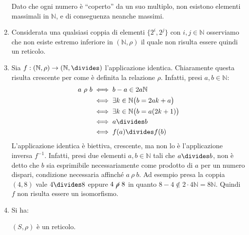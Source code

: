 \begin{enumerate}[label=(\textit{\roman*})]
Dato che ogni numero è ``coperto'' da un suo multiplo, non esistono elementi massimali in $\mathbb{N}$, e di conseguenza neanche massimi.
\item Considerata una qualsiasi coppia di elementi $\{2^{i},2^{j}\}$ con $i,j \in \mathbb{N}$ osserviamo che non esiste estremo inferiore in $(\mathbb{N},\rho)$ il quale non risulta essere quindi un reticolo.
\item Sia $f: (\mathbb{N},\rho) \rightarrow (\mathbb{N},\divides)$ l'applicazione identica. Chiaramente questa risulta crescente per come è definita la relazione $\rho$. Infatti, presi $a, b \in \mathbb{N}$:
\begin{align*}
	a \ \rho \ b &\iff b-a \in 2a\mathbb{N} \\
	&\iff \exists k \in \mathbb{N} \bigl( b= 2ak+a\bigr) \\
	&\iff \exists k \in \mathbb{N} \bigl(b=a(2k+1)\bigr) \\
	&\iff a \divides b\\
	&\iff f(a) \divides f(b)
\end{align*}
L'applicazione identica è biettiva, crescente, ma non lo è l'applicazione inversa $f^{-1}$. Infatti, presi due elementi $a,b \in \mathbb{N}$ tali che $a \divides b$, non è detto che $b$ sia esprimibile necessariamente come prodotto di $a$ per un numero dispari, condizione necessaria affinché $a \ \rho \ b$. Ad esempio presa la coppia $(4,8)$ vale $4 \divides 8$ eppure $ 4 \ \cancel{\rho} \ 8$ in quanto $8-4 \notin 2 \cdot 4 \mathbb{N} = 8\mathbb{N}$. Quindi $f$ non risulta essere un isomorfismo.
\item Si ha:
\begin{center}
\end{center}
$(S,\rho)$ è un reticolo.
\end{enumerate}
